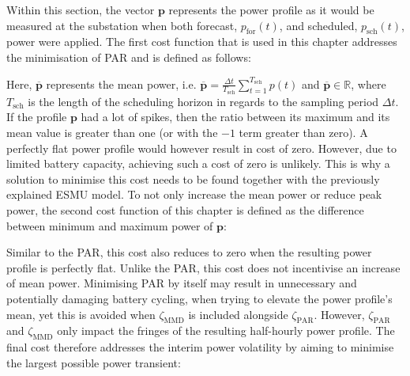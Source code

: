 

Within this section, the vector $\textbf{p}$ represents the power profile as it would be measured at the substation when both forecast, $p_\text{for}(t)$, and scheduled, $p_\text{sch}(t)$, power were applied.
The first cost function that is used in this chapter addresses the minimisation of PAR and is defined as follows:





Here, $\overline{\textbf{p}}$ represents the mean power, i.e. $\overline{\textbf{p}} = \frac{\Delta t}{T_\text{sch}}\sum_{t=1}^{T_\text{sch}}p(t)$ and $\overline{\textbf{p}} \in \mathbb{R}$, where $T_\text{sch}$ is the length of the scheduling horizon in regards to the sampling period $\Delta t$.
If the profile $\textbf{p}$ had a lot of spikes, then the ratio between its maximum and its mean value is greater than one (or with the $-1$ term greater than zero).
A perfectly flat power profile would however result in cost of zero.
However, due to limited battery capacity, achieving such a cost of zero is unlikely.
This is why a solution to minimise this cost needs to be found together with the previously explained ESMU model.
To not only increase the mean power or reduce peak power, the second cost function of this chapter is defined as the difference between minimum and maximum power of $\textbf{p}$:




Similar to the PAR, this cost also reduces to zero when the resulting power profile is perfectly flat.
Unlike the PAR, this cost does not incentivise an increase of mean power.
Minimising PAR by itself may result in unnecessary and potentially damaging battery cycling, when trying to elevate the power profile's mean, yet this is avoided when $\zeta_\text{MMD}$ is included alongside $\zeta_\text{PAR}$.
However, $\zeta_\text{PAR}$ and $\zeta_\text{MMD}$ only impact the fringes of the resulting half-hourly power profile.
The final cost therefore addresses the interim power volatility by aiming to minimise the largest possible power transient:

